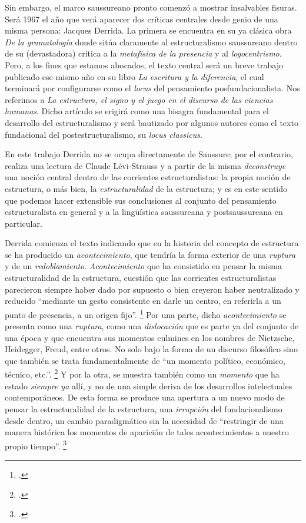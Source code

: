 Sin embargo, el marco saussureano pronto comenzó a mostrar insalvables fisuras. Será 1967 el año que verá aparecer dos críticas centrales desde genio de una misma persona: Jacques Derrida. La primera se encuentra en su ya clásica obra \emph{De la gramatología} donde sitúa claramente al estructuralismo saussureano dentro de su (devastadora) crítica a la \emph{metafísica de la presencia} y al \emph{logocentrismo}. Pero, a los fines que estamos abocados, el texto central será un breve trabajo publicado ese mismo año en su libro \emph{La escritura y la diferencia}, el cual terminará por configurarse como el \emph{locus} del pensamiento posfundacionalista. Nos referimos a \emph{La estructura, el signo y el juego en el discurso de las ciencias humanas}. Dicho artículo se erigirá como una bisagra fundamental para el desarrollo del estructuralismo y será bautizado por algunos autores como el texto fundacional del postestructuralismo, su \emph{locus classicus}.

En este trabajo Derrida no se ocupa directamente de Saussure; por el contrario, realiza una lectura de Claude Lévi-Strauss y a partir de la misma \emph{deconstruye} una noción central dentro de las corrientes estructuralistas: la propia noción de estructura, o más bien, la \emph{estructuralidad} de la estructura; y es en este sentido que podemos hacer extensible sus conclusiones al conjunto del pensamiento estructuralista en general y a la lingüística saussureana y postsaussureana en particular.

Derrida comienza el texto indicando que en la historia del concepto de estructura se ha producido un \emph{acontecimiento}, que tendría la forma exterior de una \emph{ruptura} y de un \emph{redoblamiento}. \emph{Acontecimiento} que ha consistido en pensar la misma estructuralidad de la estructura, cuestión que las corrientes estructuralistas parecieron siempre haber dado por supuesto o bien creyeron haber neutralizado y reducido \enquote{mediante un gesto consistente en darle un centro, en referirla a un punto de presencia, a un origen fijo}. \footcite[][383]{@6997-DERRIDA1989} Por una parte, dicho \emph{acontecimiento} se presenta como una \emph{ruptura}, como una \emph{dislocación} que es parte ya del conjunto de una época y que encuentra sus momentos culmines en los nombres de Nietzsche, Heidegger, Freud, entre otros. No solo bajo la forma de un discurso filosófico sino que también se trata fundamentalmente de \enquote{un momento político, económico, técnico, etc.}. \footcite[][388]{@6997-DERRIDA1989} Y por la otra, se muestra también como un \emph{momento} que ha estado \emph{siempre ya} allí, y no de una simple deriva de los desarrollos intelectuales contemporáneos. De esta forma se produce una apertura a un nuevo modo de pensar la estructuralidad de la estructura, una \emph{irrupción} del fundacionalismo desde dentro, un cambio paradigmático sin la necesidad de \enquote{restringir de una manera histórica los momentos de aparición de tales acontecimientos a nuestro propio tiempo}. \footcite[][31]{@6998-MARCHART2009}

